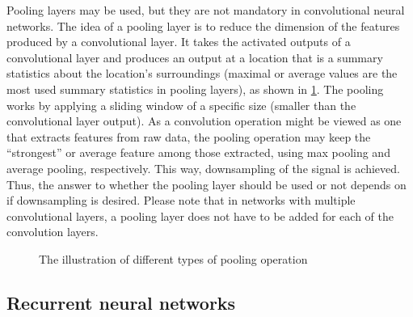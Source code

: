 Pooling layers may be used, but they are not mandatory in convolutional neural networks. The idea of a pooling layer is to reduce the dimension of the features produced by a convolutional layer. It takes the activated outputs of a convolutional layer and produces an output at a location that is a summary statistics about the location's surroundings (maximal or average values are the most used summary statistics in pooling layers), as shown in \cref{fig:Pooling}. The pooling works by applying a sliding window of a specific size (smaller than the convolutional layer output). As a convolution operation might be viewed as one that extracts features from raw data, the pooling operation may keep the ``strongest'' or average feature among those extracted, using max pooling and average pooling, respectively. This way, downsampling of the signal is achieved. Thus, the answer to whether the pooling layer should be used or not depends on if downsampling is desired. Please note that in networks with multiple convolutional layers, a pooling layer does not have to be added for each of the convolution layers.

\begin{figure}
    \centering
    \vfill
    \caption{The illustration of different types of pooling operation}
    \label{fig:Pooling}
\end{figure}

\subsection{Recurrent neural networks}

